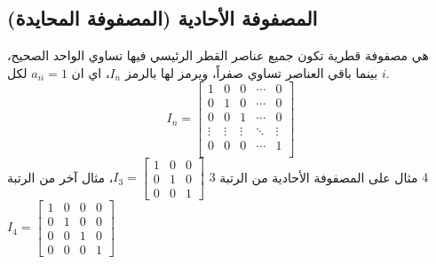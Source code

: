 	\subsection{المصفوفة الأحادية (المصفوفة المحايدة)}
	هي مصفوفة قطرية تكون جميع عناصر القطر الرئيسي فيها تساوي الواحد الصحيح، بينما باقي العناصر تساوي صفراً، ويرمز لها بالرمز  
	$I_n$، اي ان $a_{ii}=1$ لكل $i$.
	\[
	I_n =
	\begin{bmatrix}
		1 & 0 & 0 & \cdots & 0\\
		0 & 1 & 0 & \cdots & 0\\
		0 & 0 & 1 & \cdots & 0\\
		\vdots & \vdots & \vdots & \ddots & \vdots\\
		0 & 0 & 0 & \cdots & 1\\
	\end{bmatrix}
	\]
	مثال على المصفوفة الأحادية من الرتبة $3$
	$
	I_3=
	\begin{bmatrix}
		1&0&0\\
		0&1&0\\
		0&0&1
	\end{bmatrix}
	$،
	مثال آخر من الرتبة $4$
	$
	I_4=
	\begin{bmatrix}
		1&0&0&0\\
		0&1&0&0\\
		0&0&1&0\\
		0&0&0&1
	\end{bmatrix}
	$
	
